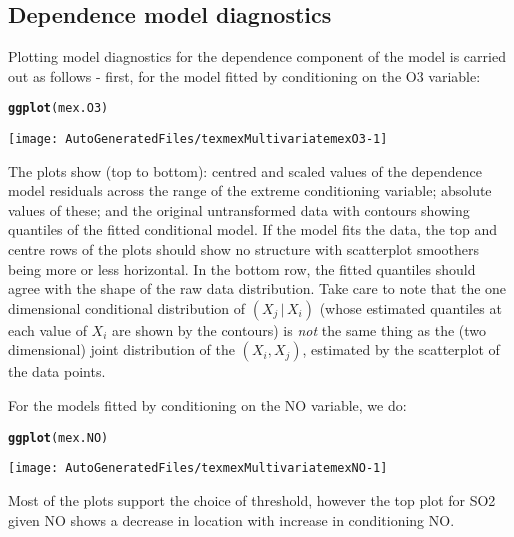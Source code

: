 \documentclass[10pt]{article}\usepackage[]{graphicx}\usepackage[]{color}
\makeatletter
\def\maxwidth{ %
  \ifdim\Gin@nat@width>\linewidth
    \linewidth
  \else
    \Gin@nat@width
  \fi
}
\newcommand{\hlstd}[1]{\textcolor[rgb]{0.345,0.345,0.345}{#1}}%
\newcommand{\hlkwd}[1]{\textcolor[rgb]{0.737,0.353,0.396}{\textbf{#1}}}%
\newenvironment{kframe}{%
 \def\at@end@of@kframe{}%
 \ifinner\ifhmode%
  \def\at@end@of@kframe{\end{minipage}}%
  \begin{minipage}{\columnwidth}%
 \fi\fi%
 \def\FrameCommand##1{\hskip\@totalleftmargin \hskip-\fboxsep
 \colorbox{shadecolor}{##1}\hskip-\fboxsep
     \hskip-\linewidth \hskip-\@totalleftmargin \hskip\columnwidth}%
 \MakeFramed {\advance\hsize-\width
   \@totalleftmargin\z@ \linewidth\hsize
   \@setminipage}}%
 {\par\unskip\endMakeFramed%
 \at@end@of@kframe}
\newenvironment{knitrout}{}{} %
\makeatother
\begin{document}
\subsection{Dependence model diagnostics}
%
Plotting model diagnostics for the dependence component of the model is carried
out as follows - first, for the model fitted by conditioning on the O3 variable:

\begin{knitrout}
\color{fgcolor}\begin{kframe}
\begin{alltt}
\hlkwd{ggplot}\hlstd{(mex.O3)}
\end{alltt}
\end{kframe}
\texttt{[image: AutoGeneratedFiles/texmexMultivariatemexO3-1]} 

\end{knitrout}

The plots show (top to bottom): centred and scaled values of the
dependence model residuals across
the range of the extreme conditioning variable; absolute
values of these; and the original untransformed data with contours
showing quantiles of the fitted conditional model. If the
model fits the data, the top and centre rows of the plots should show no
structure with scatterplot smoothers being more or
less horizontal.  In the bottom row, the fitted quantiles should
agree with the shape of the raw data distribution.  Take care to
note that the one dimensional conditional distribution of $(X_j \,|\, X_i)$
(whose estimated quantiles at each value of $X_i$ are shown by the contours) is
\emph{not} the same thing as the (two dimensional) joint distribution of the
$(X_i,X_j)$, estimated by the scatterplot of the data points.

For the models fitted by conditioning on the NO variable, we do:

\begin{knitrout}
\color{fgcolor}\begin{kframe}
\begin{alltt}
\hlkwd{ggplot}\hlstd{(mex.NO)}
\end{alltt}
\end{kframe}
\texttt{[image: AutoGeneratedFiles/texmexMultivariatemexNO-1]} 

\end{knitrout}

Most of the plots support the choice of threshold, however the top plot for SO2
given NO shows a decrease in location with increase in conditioning NO.
\end{document}
